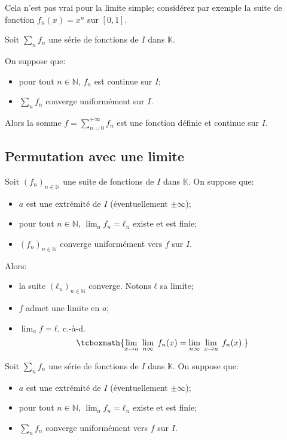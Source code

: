 \documentclass{yann}
\newcommand{\fn}{(f_n)_{n∈ℕ}}
\newcommand{\Sfn}{∑_n f_n}
\begin{document}

Cela n'est pas vrai pour la limite simple;
considérez par exemple la suite de fonction $f_n(x) = x^n$ sur $[0,1]$.


Soit $\Sfn$ une série de fonctions de $I$ dans $𝕂$.

On suppose que:
\begin{itemize}
\item
  pour tout $n∈ℕ$, $f_n$ est continue sur $I$;
\item
  $\Sfn$ converge uniformément sur $I$.
\end{itemize}

Alors la somme $f = ∑_{n=0}^{+∞} f_n$ est une fonction définie et continue sur $I$.

\subsection{Permutation avec une limite}\label{sec:perm-lim}


Soit $\fn$ une suite de fonctions de $I$ dans $𝕂$.
On suppose que:
\begin{itemize}
\item
  $a$ est une extrémité de $I$ (éventuellement $±∞$);
\item
  pour tout $n∈ℕ$, $\lim_a f_n = ℓ_n$ existe et est finie;
\item
  $\fn$ converge uniformément vers $f$ sur $I$.
\end{itemize}

Alors:
\begin{itemize}
\item
  la suite $(ℓ_n)_{n∈ℕ}$ converge. Notons $ℓ$ sa limite;
\item
  $f$ admet une limite en $a$;
\item
  $\lim_a f = ℓ$, c.-à-d.
  \[ \tcboxmath{
      \lim_{x\to a} \; \lim_\ninf \; f_n(x) = \lim_\ninf \; \lim_{x\to a} \; f_n(x).
  } \]
\end{itemize}


Soit $\Sfn$ une série de fonctions de $I$ dans $𝕂$.
On suppose que:
\begin{itemize}
\item
  $a$ est une extrémité de $I$ (éventuellement $±∞$);
\item
  pour tout $n∈ℕ$, $\lim_a f_n = ℓ_n$ existe et est finie;
\item
  $\Sfn$ converge uniformément vers $f$ sur $I$.
\end{itemize}
\end{document}
